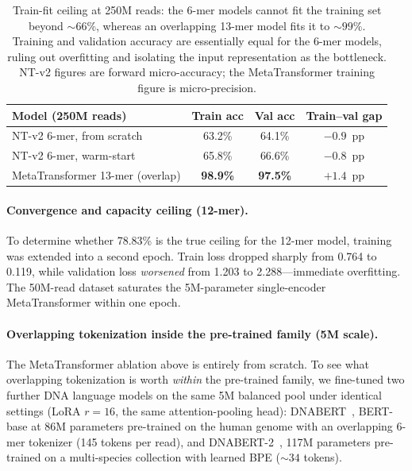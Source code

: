 \begin{table}[htbp]
    \centering
    \caption{Train-fit ceiling at 250M reads: the 6-mer models cannot fit the training set beyond ${\sim}66\%$, whereas an overlapping 13-mer model fits it to ${\sim}99\%$. Training and validation accuracy are essentially equal for the 6-mer models, ruling out overfitting and isolating the input representation as the bottleneck. NT-v2 figures are forward micro-accuracy; the MetaTransformer training figure is micro-precision.}
    \label{tab:train-fit}
    \small
    \begin{tabular}{lccc}
        \toprule
        \textbf{Model (250M reads)} & \textbf{Train acc} & \textbf{Val acc} & \textbf{Train--val gap} \\
        \midrule
        NT-v2 6-mer, from scratch        & 63.2\% & 64.1\% & $-0.9$~pp \\
        NT-v2 6-mer, warm-start          & 65.8\% & 66.6\% & $-0.8$~pp \\
        MetaTransformer 13-mer (overlap) & \textbf{98.9\%} & \textbf{97.5\%} & $+1.4$~pp \\
        \bottomrule
    \end{tabular}
\end{table}

\paragraph{Convergence and capacity ceiling (12-mer).}
To determine whether 78.83\% is the true ceiling for the 12-mer model, training was extended into a second epoch. Train loss dropped sharply from 0.764 to 0.119, while validation loss \emph{worsened} from 1.203 to 2.288---immediate overfitting. The 50M-read dataset saturates the 5M-parameter single-encoder MetaTransformer within one epoch.

\paragraph{Overlapping tokenization inside the pre-trained family (5M scale).}
The MetaTransformer ablation above is entirely from scratch. To see what overlapping
tokenization is worth \emph{within} the pre-trained family, we fine-tuned two further
DNA language models on the same 5M balanced pool under identical settings (LoRA
$r=16$, the same attention-pooling head): DNABERT~\cite{Ji2021}, BERT-base at 86M
parameters pre-trained on the human genome with an overlapping 6-mer tokenizer (145
tokens per read), and DNABERT-2~\cite{Zhou2024dnabert2}, 117M parameters pre-trained
on a multi-species collection with learned BPE (${\sim}34$ tokens).

